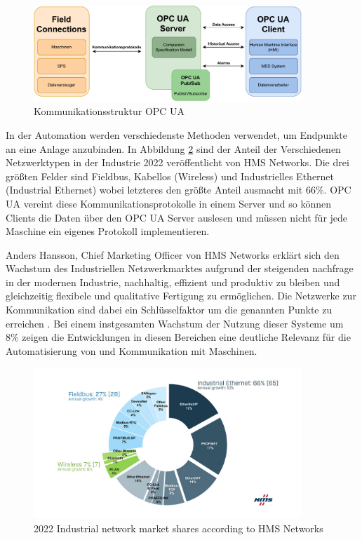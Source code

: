 \documentclass[a4paper, 12pt, oneside, toc=listofnumbered, bibliography=totoc]{scrbook}
\begin{document}
		\begin{figure}[H]
			\centering
			\includegraphics[width=0.9\textwidth]{res/diagramms/OPCUA.pdf}
			\caption{Kommunikationsstruktur OPC UA}
			\label{fig:OPCUA_Structure}
		\end{figure}
		
		In der Automation werden verschiedenste Methoden verwendet, um Endpunkte an eine Anlage anzubinden. In Abbildung \ref{fig:share} sind der Anteil der Verschiedenen Netzwerktypen in der Industrie 2022 veröffentlicht von HMS Networks. Die drei größten Felder sind Fieldbus, Kabellos (Wireless) und Industrielles Ethernet (Industrial Ethernet) wobei letzteres den größte Anteil ausmacht mit 66\%. OPC UA vereint diese Kommunikationsprotokolle in einem Server und so können Clients die Daten über den OPC UA Server auslesen und müssen nicht für jede Maschine ein eigenes Protokoll implementieren. \cite{noauthor_2022_nodate}
		
		Anders Hansson, Chief Marketing Officer von HMS Networks erklärt sich den Wachstum des Industriellen Netzwerkmarktes aufgrund der steigenden nachfrage in der modernen Industrie, nachhaltig, effizient und produktiv zu bleiben und gleichzeitig flexibele und qualitative Fertigung zu ermöglichen. Die Netzwerke zur Kommunikation sind dabei ein Schlüsselfaktor um die genannten Punkte zu erreichen \cite{noauthor_2022_nodate}. Bei einem instgesamten Wachstum der Nutzung dieser Systeme um 8\% zeigen die Entwicklungen in diesen Bereichen eine deutliche Relevanz für die Automatisierung von und Kommunikation mit Maschinen. 
		
		
		\begin{figure}[H]
			\centering
			\includegraphics[width=0.9\textwidth]{res/network-shares.png}
			\caption{2022 Industrial network market shares according to HMS Networks \cite{noauthor_2022_nodate}} 
			\label{fig:share}
		\end{figure}
	
\end{document}
